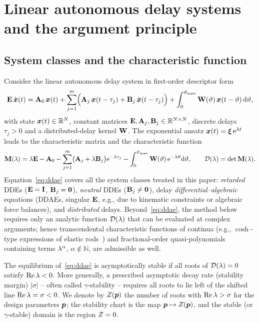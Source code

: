 \section{Linear autonomous delay systems and the argument principle}\label{sec:theory}

\subsection{System classes and the characteristic function}\label{sec:classes}

Consider the linear autonomous delay system in first-order descriptor form
\begin{equation}\label{eq:ddae}
  \mathbf{E}\,\dot{\boldsymbol{x}}(t) = \mathbf{A}_0\,\boldsymbol{x}(t)
  + \sum_{j=1}^{m}\Bigl(\mathbf{A}_j\,\boldsymbol{x}(t-\tau_j) + \mathbf{B}_j\,\dot{\boldsymbol{x}}(t-\tau_j)\Bigr)
  + \int_{0}^{\vartheta_{\mathrm{max}}} \mathbf{W}(\vartheta)\,\boldsymbol{x}(t-\vartheta)\,\mathrm{d}\vartheta ,
\end{equation}
with state $\boldsymbol{x}(t)\in\mathbb R^{N}$, constant matrices
$\mathbf{E},\mathbf{A}_j,\mathbf{B}_j\in\mathbb R^{N\times N}$, discrete delays
$\tau_j>0$ and a distributed-delay kernel $\mathbf{W}$. The exponential ansatz
$\boldsymbol{x}(t)=\boldsymbol{\xi}\,\mathrm{e}^{\lambda t}$ leads to the characteristic matrix and
the characteristic function
\begin{equation}\label{eq:charfun}
  \mathbf{M}(\lambda) = \lambda\mathbf{E} - \mathbf{A}_0
   - \sum_{j=1}^{m}\bigl(\mathbf{A}_j + \lambda\mathbf{B}_j\bigr)\mathrm{e}^{-\lambda\tau_j}
   - \int_{0}^{\vartheta_{\mathrm{max}}}\mathbf{W}(\vartheta)\,\mathrm{e}^{-\lambda\vartheta}\mathrm{d}\vartheta,
  \qquad
  \mathcal{D}(\lambda) = \det\mathbf{M}(\lambda).
\end{equation}
Equation~\eqref{eq:ddae} covers all the system classes treated in this paper:
\emph{retarded} DDEs ($\mathbf{E}=\mathbf{I}$, $\mathbf{B}_j=\mathbf{0}$), \emph{neutral}
DDEs ($\mathbf{B}_j\neq\mathbf{0}$), delay \emph{differential--algebraic} equations
(DDAEs, singular $\mathbf{E}$, e.g., due to kinematic constraints or algebraic
force balances), and \emph{distributed} delays. Beyond~\eqref{eq:ddae}, the
method below requires only an analytic function $\mathcal{D}(\lambda)$ that can be
evaluated at complex arguments; hence transcendental characteristic functions
of continua (e.g., $\cosh$-type expressions of elastic
rods~\cite{zhang2016exact}) and fractional-order quasi-polynomials
containing terms $\lambda^{\alpha}$, $\alpha\notin\mathbb N$,
are admissible as well.

The equilibrium of~\eqref{eq:ddae} is asymptotically stable if all roots of
$\mathcal{D}(\lambda)=0$ satisfy $\operatorname{Re}\lambda<0$. More generally, a prescribed asymptotic
decay rate (stability margin) $|\sigma|$ -- often called $\gamma$-stability --
requires all roots to lie left of the shifted line $\operatorname{Re}\lambda=\sigma<0$. We
denote by
$Z(\boldsymbol{p})$ the number of roots with $\operatorname{Re}\lambda>\sigma$ for the design
parameters $\boldsymbol{p}$; the stability chart is the map
$\boldsymbol{p}\mapsto Z(\boldsymbol{p})$, and the stable (or $\gamma$-stable) domain
is the region $Z=0$.

